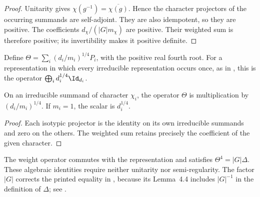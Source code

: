 \begin{proof}\leanok
    Unitarity gives $\chi(g^{-1})=\overline{\chi(g)}$. Hence the character
    projectors of the occurring summands are self-adjoint. They are also
    idempotent, so they are positive. The coefficients
    $d_\chi/(|G|m_\chi)$ are positive. Their weighted sum is therefore
    positive; its invertibility makes it positive definite.
\end{proof}

\begin{definition}%
    \label{def:peps_representation_theta}
    \leanok
    Define $\Theta=\sum_i(d_i/m_i)^{1/4}P_i$, with the positive real fourth
    root. For a representation in which every irreducible representation
    occurs once, as in \cite[Section~7]{Schuch2010PEPS}, this is the
    operator $\bigoplus_i d_i^{1/4}\Id_{d_i}$.
\end{definition}

\begin{lemma}%
    \label{thm:peps_representation_theta_scalar}
    \leanok
    On an irreducible summand of character $\chi_i$, the operator $\Theta$
    is multiplication by $(d_i/m_i)^{1/4}$. If $m_i=1$, the scalar is
    $d_i^{1/4}$.
\end{lemma}

\begin{proof}\leanok
    Each isotypic projector is the identity on its own irreducible summands
    and zero on the others. The weighted sum retains precisely the coefficient
    of the given character.
\end{proof}

\begin{lemma}%
    \label{thm:peps_representation_theta_power}
    \leanok
    The weight operator commutes with the representation and satisfies
    $\Theta^4=|G|\Delta$. These algebraic identities require neither unitarity
    nor semi-regularity. The factor $|G|$ corrects the printed equality
    in \cite[Section~7]{Schuch2010PEPS}, because its Lemma~4.4 includes
    $|G|^{-1}$ in the definition of $\Delta$; see
    \cite{gap:rmp_peps_quantum_double_g_isometry}.
\end{lemma}

